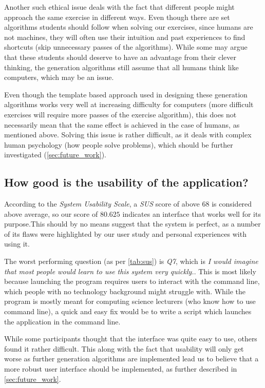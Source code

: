 \documentclass{l4proj}
\begin{document}
Another such ethical issue deals with the fact that different people might approach the same exercise in different ways. Even though there are set algorithms students should follow when solving our exercises, since humans are not machines, they will often use their intuition and past experiences to find shortcuts (skip unnecessary passes of the algorithms). While some may argue that these students should deserve to have an advantage from their clever thinking, the generation algorithms still assume that all humans think like computers, which may be an issue.

Even though the template based approach used in designing these generation algorithms works very well at increasing difficulty for computers (more difficult exercises will require more passes of the exercise algorithm), this does not necessarily mean that the same effect is achieved in the case of humans, as mentioned above. Solving this issue is rather difficult, as it deals with complex human psychology (how people solve problems), which should be further investigated (\autoref{sec:future_work}).

\subsection*{How good is the usability of the application?}

According to the \emph{System Usability Scale}, a \emph{SUS} score of above $68$ is considered above average, so our score of $80.625$ indicates an interface that works well for its purpose.This should by no means suggest that the system is perfect, as a number of its flaws were highlighted by our user study and personal experiences with using it.

The worst performing question (as per \autoref{tab:sus}) is \emph{Q7}, which is \emph{I would imagine that most people would learn to use this system very quickly.}. This is most likely because launching the program requires users to interact with the command line, which people with no technology background might struggle with. While the program is mostly meant for computing science lecturers (who know how to use command line), a quick and easy fix would be to write a script which launches the application in the command line.

While some participants thought that the interface was quite easy to use, others found it rather difficult. This along with the fact that usability will only get worse as further generation algorithms are implemented lead us to believe that a more robust user interface should be implemented, as further described in \autoref{sec:future_work}.
\end{document}
